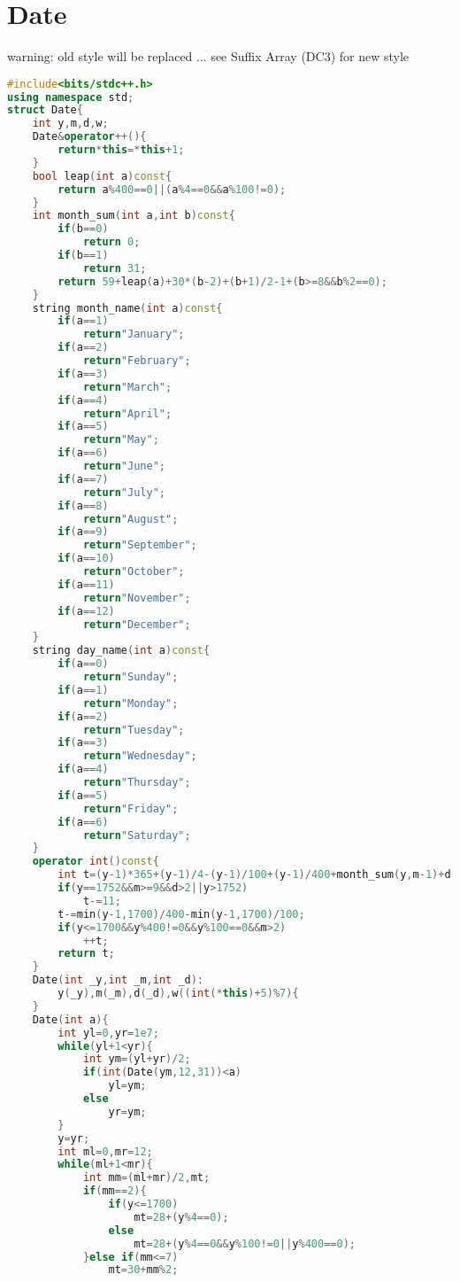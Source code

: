\documentclass{book}
\begin{document}
\section{Date}
warning: old style will be replaced ... see Suffix Array (DC3) for new style\begin{lstlisting}[language=C++,title={Date.hpp (3596 bytes, 145 lines)}]
#include<bits/stdc++.h>
using namespace std;
struct Date{
    int y,m,d,w;
    Date&operator++(){
        return*this=*this+1;
    }
    bool leap(int a)const{
        return a%400==0||(a%4==0&&a%100!=0);
    }
    int month_sum(int a,int b)const{
        if(b==0)
            return 0;
        if(b==1)
            return 31;
        return 59+leap(a)+30*(b-2)+(b+1)/2-1+(b>=8&&b%2==0);
    }
    string month_name(int a)const{
        if(a==1)
            return"January";
        if(a==2)
            return"February";
        if(a==3)
            return"March";
        if(a==4)
            return"April";
        if(a==5)
            return"May";
        if(a==6)
            return"June";
        if(a==7)
            return"July";
        if(a==8)
            return"August";
        if(a==9)
            return"September";
        if(a==10)
            return"October";
        if(a==11)
            return"November";
        if(a==12)
            return"December";
    }
    string day_name(int a)const{
        if(a==0)
            return"Sunday";
        if(a==1)
            return"Monday";
        if(a==2)
            return"Tuesday";
        if(a==3)
            return"Wednesday";
        if(a==4)
            return"Thursday";
        if(a==5)
            return"Friday";
        if(a==6)
            return"Saturday";
    }
    operator int()const{
        int t=(y-1)*365+(y-1)/4-(y-1)/100+(y-1)/400+month_sum(y,m-1)+d;
        if(y==1752&&m>=9&&d>2||y>1752)
            t-=11;
        t-=min(y-1,1700)/400-min(y-1,1700)/100;
        if(y<=1700&&y%400!=0&&y%100==0&&m>2)
            ++t;
        return t;
    }
    Date(int _y,int _m,int _d):
        y(_y),m(_m),d(_d),w((int(*this)+5)%7){
    }
    Date(int a){
        int yl=0,yr=1e7;
        while(yl+1<yr){
            int ym=(yl+yr)/2;
            if(int(Date(ym,12,31))<a)
                yl=ym;
            else
                yr=ym;
        }
        y=yr;
        int ml=0,mr=12;
        while(ml+1<mr){
            int mm=(ml+mr)/2,mt;
            if(mm==2){
                if(y<=1700)
                    mt=28+(y%4==0);
                else
                    mt=28+(y%4==0&&y%100!=0||y%400==0);
            }else if(mm<=7)
                mt=30+mm%2;

\end{lstlisting}
\end{document}
